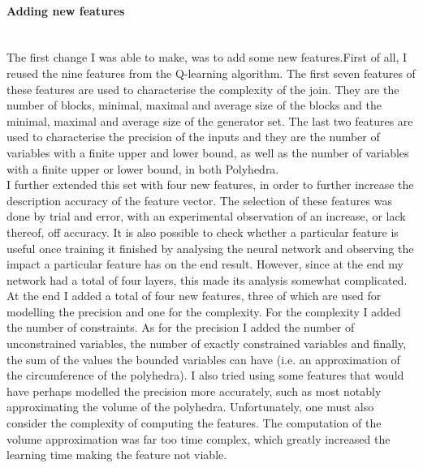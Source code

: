 \paragraph{Adding new features}\mbox{}\\
The first change I was able to make, was to add some new features.First of all, I reused the nine features from the Q-learning algorithm. The first seven features of these features are used to characterise the complexity of the join. They are the number of blocks, minimal, maximal and average size of the blocks and the minimal, maximal and average size of the generator set. The last two features are used to characterise the precision of the inputs and they are the number of variables with a finite upper and lower bound, as well as the number of variables with a finite upper or lower bound, in both Polyhedra.\\
I further extended this set with four new features, in order to further increase the description accuracy of the feature vector. The selection of these features was done by trial and error, with an experimental observation of an increase, or lack thereof, off accuracy. It is also possible to check whether a particular feature is useful once training it finished by analysing the neural network and observing the impact a particular feature has on the end result. However, since at the end my network had a total of four layers, this made its analysis somewhat complicated.\\
At the end I added a total of four new features, three of which are used for modelling the precision and one for the complexity. For the complexity I added the number of constraints. As for the precision I added the number of unconstrained variables, the number of exactly constrained variables and finally, the sum of the values the bounded variables can have (i.e. an approximation of the circumference of the polyhedra). I also tried using some features that would have perhaps modelled the precision more accurately, such as most notably approximating the volume of the polyhedra. Unfortunately, one must also consider the complexity of computing the features. The computation of the volume approximation was far too time complex, which greatly increased the learning time making the feature not viable.\\
